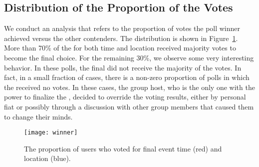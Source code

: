 \subsection{Distribution of the Proportion of the Votes}

{We conduct an analysis that refers to the proportion of votes the poll winner achieved versus the other contenders.}
The distribution is shown in Figure~\ref{fig:winner}. 
More than 70\% of the  for both time and location
received majority votes to become the final choice.  For the remaining 30\%, we observe some
very interesting behavior. In these polls, the final  did not receive the majority of the votes. In fact, in a small fraction of cases, there is a non-zero proportion of polls in which the  received no votes.  In these cases, the group host, who is the only one with the power to finalize the , decided to override the  voting results, either by personal fiat or possibly through a discussion with other group members that caused them to change their minds.

\iffalse
 not the ones which receive the most votes, or even receive 
zero votes. Due to the fact that final options are only decided by group host, maybe host doesn't like
the poll results. Another reasonable explanation can be that the group members discussed their 
availabilities and changed their minds in the end. We will further discuss this abnormal behavior in our
group decision section.
\fi
\begin{figure}
\centering
\texttt{[image: winner]}
\caption{The proportion of users who voted for final event time (red) and location (blue).}
\label{fig:winner}
\end{figure}

